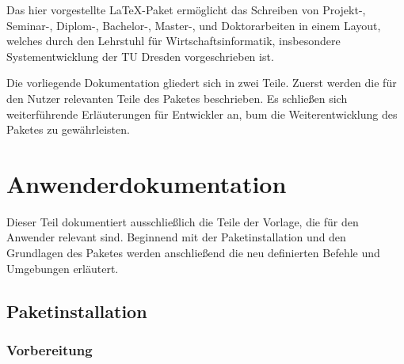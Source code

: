 \documentclass[english, trackchanges, hyperref, ngerman ,pdf, mp, mppdf]{wise}
\begin{document}

\begin{preface}
  \tableofcontents
\end{preface}



\introduction
Das hier vorgestellte \LaTeX{}-Paket ermöglicht das Schreiben von
Projekt-, Seminar-, Diplom-, Bachelor-, Master-, und Doktorarbeiten in einem Layout, welches
durch den Lehrstuhl für Wirtschaftsinformatik, insbesondere Systementwicklung
der TU Dresden vorgeschrieben ist.

Die vorliegende Dokumentation gliedert sich in zwei Teile. Zuerst
werden die für den Nutzer relevanten Teile des Paketes beschrieben.
Es schließen sich weiterführende Erläuterungen für Entwickler an,
bum die Weiterentwicklung des Paketes zu gewährleisten. 


\section{Anwenderdokumentation}

Dieser Teil dokumentiert ausschließlich die Teile der Vorlage, die
für den Anwender relevant sind. Beginnend mit der Paketinstallation
und den Grundlagen des Paketes werden anschließend die neu definierten
Befehle und Umgebungen erläutert.

\subsection{Paketinstallation}

\subsubsection{Vorbereitung}

\end{document}
